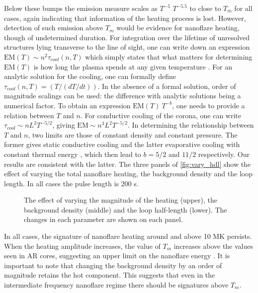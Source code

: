 \documentclass[apj]{emulateapj}
\begin{document}
	\par Below these bumps the emission measure scales as $T^{-5}$  $T^{-5.5}$ to close to $T_m$ for all cases, again indicating that information of the heating process is lost. However, detection of such emission above $T_m$ would be evidence for nanoflare heating, though of undetermined duration.  For integration over the lifetime of unresolved structures lying transverse to the line of sight, one can write down an expression $\mathrm{EM}(T) \sim n^2\tau_{cool}(n, T)$ which simply states that what matters for determining $\mathrm{EM}(T)$ is how long the plasma spends at any given temperature \citep[e.g.][]{cargill_implications_1994,cargill_nanoflare_2004}. For an analytic solution for the cooling, one can formally define $\tau_{cool}(n, T) = (T/(dT/dt))$. In the absence of a formal solution, order of magnitude scalings can be used: the difference with analytic solutions being a numerical factor. To obtain an expression $\mathrm{EM}(T) ~ T^{-b}$, one needs to provide a relation between $T$ and $n$. For conductive cooling of the corona, one can write $\tau_{cool} \sim nL^2T^{-5/2}$, giving $\mathrm{EM} \sim n^3L^2T^{-5/2}$. In determining the relationship between $T$ and $n$, two limits are those of constant density and constant pressure. The former gives static conductive cooling \citep[e.g.][]{antiochos_influence_1976} and the latter evaporative cooling with constant thermal energy \citep[e.g.][]{antiochos_evaporative_1978}, which then lead to $b = 5/2$ and $11/2$ respectively. Our results are consistent with the latter.
	The three panels of \autoref{fig:vary_hdl} show the effect of varying the total nanoflare heating, the background density and the loop length. In all cases the pulse length is 200 s.
	\begin{figure}
		\centering
		\caption{The effect of varying the magnitude of the heating (upper), the background density (middle) and the loop half-length (lower). The changes in each parameter are shown on each panel.}
		\label{fig:vary_hdl}
	\end{figure}
	\par In all cases, the signature of nanoflare heating around and above 10 MK persists. When the heating amplitude increases, the value of $T_m$ increases above the values seen in AR cores, suggesting an upper limit on the nanoflare energy \citep[and hence on the time between nanoflares; see][]{cargill_active_2014}. It is important to note that changing the background density by an order of magnitude retains the hot component. This suggests that even in the intermediate frequency nanoflare regime there should be signatures above $T_m$.
\end{document}
